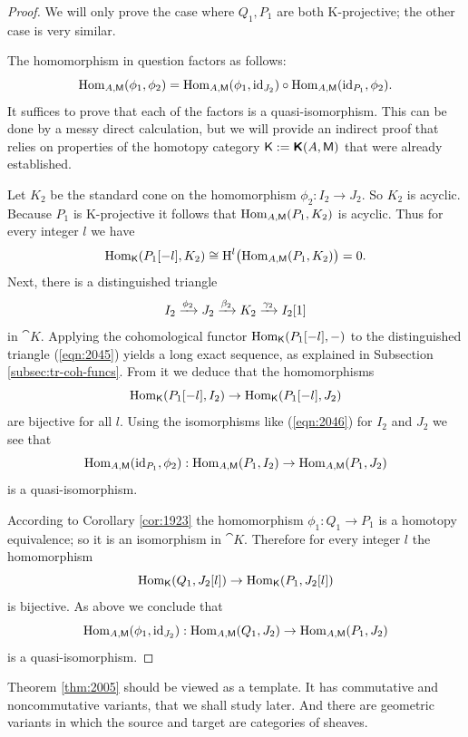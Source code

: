 \begin{proof}
We will only prove the case where $Q_1, P_1$ are both K-projective; the other 
case is very similar. 

The homomorphism in question factors as follows:
\[ \operatorname{Hom}_{A, \operatorname{\mathsf{M}}}(\phi_1, \phi_2) = 
\operatorname{Hom}_{A, \operatorname{\mathsf{M}}}(\phi_1, \operatorname{id}_{J_2})
\circ 
\operatorname{Hom}_{A, \operatorname{\mathsf{M}}}(\operatorname{id}_{P_1}, \phi_2) . \]
It suffices to prove that each of the factors is a quasi-isomorphism. This can 
be done by a messy direct calculation, but we will provide an indirect proof 
that relies on properties of the homotopy category 
$\operatorname{\mathsf{K}} := \boldsymbol{\mathsf{K}}(A, \operatorname{\mathsf{M}})$ that 
were already established. 

Let $K_2$ be the standard cone on the homomorphism 
$\phi_2 : I_2 \to J_2$. So $K_2$ is acyclic. Because $P_1$ is K-projective it 
follows that $\operatorname{Hom}_{A, \operatorname{\mathsf{M}}}(P_1, K_2)$ is acyclic. 
Thus for every integer $l$ we have 
\begin{equation} \label{eqn:2046}
 \operatorname{Hom}_{\operatorname{\mathsf{K}}}(P_1[-l], K_2) \cong 
\operatorname{H}^{l} \bigl( \operatorname{Hom}_{A, \operatorname{\mathsf{M}}}(P_1, K_2) \bigr) = 0 . 
\end{equation}
Next, there is a distinguished triangle 
\begin{equation} \label{eqn:2045}
I_2 \xrightarrow{\phi_2} J_2 \xrightarrow{\beta_2} K_2 \xrightarrow{\gamma_2} I_2[1]
\end{equation}
in $\cat{K}$. Applying the cohomological functor
$\operatorname{Hom}_{\operatorname{\mathsf{K}}}(P_1[-l], -)$
to the distinguished triangle (\ref{eqn:2045}) yields a long exact sequence, as 
explained in Subsection \ref{subsec:tr-coh-funcs}. From it we deduce that the 
homomorphisms 
\[ \operatorname{Hom}_{\operatorname{\mathsf{K}}}(P_1[-l], I_2) \to 
\operatorname{Hom}_{\operatorname{\mathsf{K}}}(P_1[-l], J_2) \]
are bijective for all $l$. Using the isomorphisms like (\ref{eqn:2046}) for 
$I_2$ and $J_2$ we see that 
\[ \operatorname{Hom}_{A, \operatorname{\mathsf{M}}}(\operatorname{id}_{P_1}, \phi_2) : 
\operatorname{Hom}_{A, \operatorname{\mathsf{M}}}(P_1, I_2) \to 
\operatorname{Hom}_{A, \operatorname{\mathsf{M}}}(P_1, J_2) \]
is a quasi-isomorphism. 

According to Corollary \ref{cor:1923} the homomorphism 
$\phi_1 : Q_1 \to P_1$ is a homotopy equivalence; so it is an isomorphism in 
$\cat{K}$. Therefore for every integer $l$ the homomorphism 
\[ \operatorname{Hom}_{\operatorname{\mathsf{K}}}(Q_1, J_2[l]) \to 
\operatorname{Hom}_{\operatorname{\mathsf{K}}}(P_1, J_2[l]) \]
is bijective. As above we conclude that
\[ \operatorname{Hom}_{A, \operatorname{\mathsf{M}}}(\phi_1, \operatorname{id}_{J_2}) : 
\operatorname{Hom}_{A, \operatorname{\mathsf{M}}}(Q_1, J_2) \to 
\operatorname{Hom}_{A, \operatorname{\mathsf{M}}}(P_1, J_2) \]
is a quasi-isomorphism. 
\end{proof}

\begin{rem} \label{rem:2040}
Theorem \ref{thm:2005} should be viewed as a template. It has 
commutative and noncommutative variants, that we shall study later. 
And there are geometric variants in which the source and target are categories 
of sheaves.
\end{rem}

